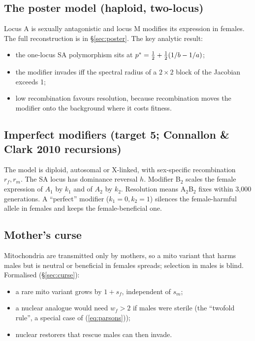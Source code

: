 \subsection{The poster model (haploid, two-locus)}
Locus A is sexually antagonistic and locus M modifies its expression in females. The full reconstruction is in \S\ref{sec:poster}. The key analytic result:
\begin{itemize}
\item the one-locus SA polymorphism sits at $p^{*}=\tfrac12+\tfrac12(1/b-1/a)$;
\item the modifier invades iff the spectral radius of a $2\times2$ block of the Jacobian exceeds 1;
\item low recombination favours resolution, because recombination moves the modifier onto the background where it costs fitness.
\end{itemize}

\subsection{Imperfect modifiers (target 5; Connallon \& Clark 2010 recursions)}
The model is diploid, autosomal or X-linked, with sex-specific recombination $r_f,r_m$. The SA locus has dominance reversal $h$. Modifier B$_2$ scales the female expression of $A_1$ by $k_1$ and of $A_2$ by $k_2$. Resolution means A$_2$B$_2$ fixes within 3,000 generations. A ``perfect'' modifier ($k_1=0,k_2=1$) silences the female-harmful allele in females and keeps the female-beneficial one.

\subsection{Mother's curse}
Mitochondria are transmitted only by mothers, so a mito variant that harms males but is neutral or beneficial in females spreads; selection in males is blind. Formalised (\S\ref{sec:curse}):
\begin{itemize}
\item a rare mito variant grows by $1+s_f$, independent of $s_m$;
\item a nuclear analogue would need $w_f>2$ if males were sterile (the ``twofold rule'', a special case of (\ref{eq:parsons}));
\item nuclear restorers that rescue males can then invade.
\end{itemize}

